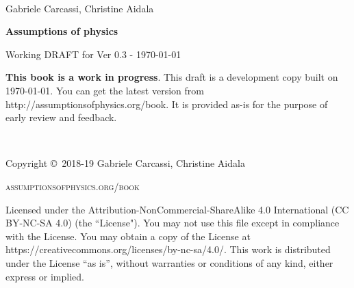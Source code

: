 \documentclass[11pt,letterpaper,fleqn]{memoir} %
\begin{document}
	




\frontmatter
\thispagestyle{empty}

~

\vspace{20pt}

{\large \noindent Gabriele Carcassi, Christine Aidala }

\vspace{60pt}

{\Huge \noindent \textbf{Assumptions of physics}}

\vspace{30pt}

{\large \noindent Working DRAFT for Ver 0.3  - \today}

\vfill


\noindent \textbf{This book is a work in progress}. This draft is a development copy built on \today. You can get the latest version from http://assumptionsofphysics.org/book. It is provided as-is for the purpose of early review and feedback. 

\newpage
~\vfill
\thispagestyle{empty}

\noindent Copyright \copyright\ 2018-19 Gabriele Carcassi, Christine Aidala

\vspace{12pt}

\noindent \textsc{assumptionsofphysics.org/book}

\vspace{12pt}

\noindent Licensed under the Attribution-NonCommercial-ShareAlike 4.0 International (CC BY-NC-SA 4.0) (the ``License"). You may not use this file except in compliance with the License. You may obtain a copy of the License at https://creativecommons.org/licenses/by-nc-sa/4.0/. This work is distributed under the License ``as is'', without warranties or conditions of any kind, either express or implied.
\end{document}
